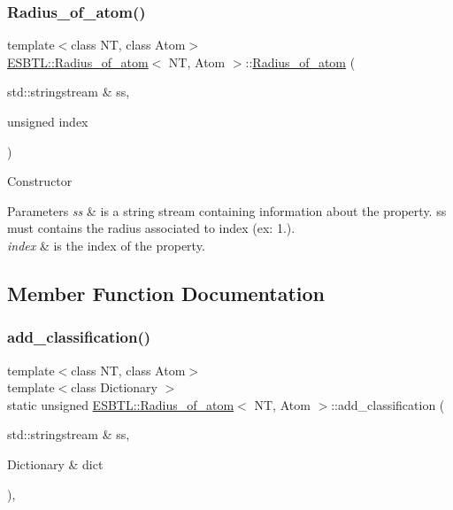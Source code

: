 \subsubsection{\texorpdfstring{Radius\+\_\+of\+\_\+atom()}{Radius\_of\_atom()}\hspace{0.1cm}{\footnotesize\ttfamily [2/2]}}
{\footnotesize\ttfamily template$<$class NT, class Atom$>$ \\
\hyperlink{classESBTL_1_1Radius__of__atom}{E\+S\+B\+T\+L\+::\+Radius\+\_\+of\+\_\+atom}$<$ NT, Atom $>$\+::\hyperlink{classESBTL_1_1Radius__of__atom}{Radius\+\_\+of\+\_\+atom} (\begin{DoxyParamCaption}\item[{std\+::stringstream \&}]{ss,  }\item[{unsigned}]{index }\end{DoxyParamCaption})\hspace{0.3cm}{\ttfamily [inline]}}

Constructor 
\begin{DoxyParams}{Parameters}
{\em ss} & is a string stream containing information about the property. ss must contains the radius associated to index (ex\+: 1.). \\
\hline
{\em index} & is the index of the property. \\
\hline
\end{DoxyParams}


\subsection{Member Function Documentation}
\mbox{\label{classESBTL_1_1Radius__of__atom_a17d41d6fcf8a0ffb4a3568c51ee96b68}} 
\subsubsection{\texorpdfstring{add\+\_\+classification()}{add\_classification()}}
{\footnotesize\ttfamily template$<$class NT, class Atom$>$ \\
template$<$class Dictionary $>$ \\
static unsigned \hyperlink{classESBTL_1_1Radius__of__atom}{E\+S\+B\+T\+L\+::\+Radius\+\_\+of\+\_\+atom}$<$ NT, Atom $>$\+::add\+\_\+classification (\begin{DoxyParamCaption}\item[{std\+::stringstream \&}]{ss,  }\item[{Dictionary \&}]{dict }\end{DoxyParamCaption})\hspace{0.3cm}{\ttfamily [inline]}, {\ttfamily [static]}}

